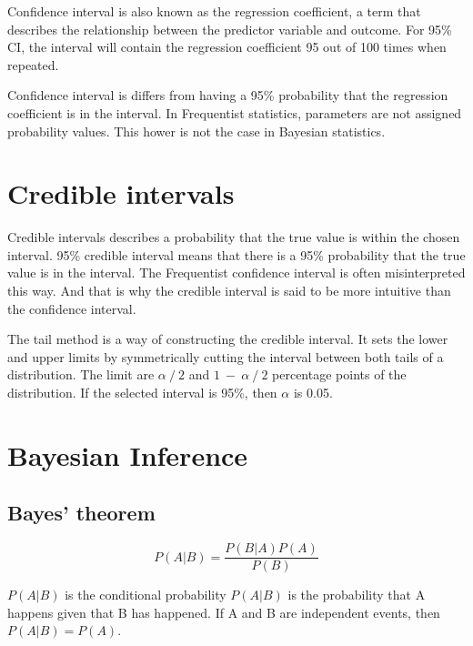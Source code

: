 Confidence interval is also known as the regression coefficient, a term that describes the relationship between the predictor variable and outcome.\cite{RegressionCoefficients} For 95\% CI, the interval will contain the regression coefficient 95 out of 100 times when repeated.\cite{Schoot2014BayesianA} 

Confidence interval is differs from having a 95\% probability that the regression coefficient is in the interval. In Frequentist statistics, parameters are not assigned probability values. \cite{FornaconWood2022UnderstandingTD} This hower is not the case in Bayesian statistics.

\section{Credible intervals}\label{CredibilityIntervals}

Credible intervals describes a probability that the true value is within the chosen interval. 95\% credible interval means that there is a 95\% probability that the true value is in the interval. The Frequentist confidence interval is often misinterpreted this way. And that is why the credible interval is said to be more intuitive than the confidence interval.\cite{FornaconWood2022UnderstandingTD} 

The tail method is a way of constructing the credible interval. It sets the lower and upper limits by symmetrically cutting the interval between both tails of a distribution. The limit are $\alpha\ /\ 2$ and $1\ -\ \alpha\ /\ 2$ percentage points of the distribution. If the selected interval is 95\%, then $\alpha$ is 0.05. \cite{Shi2009BayesianCI}

\section{Bayesian Inference}\label{BayesianInference}

\subsection{Bayes' theorem}\label{BayesianTheorem}
\begin{equation}
P(A|B) = \frac{P(B|A)P(A)}{P(B)}
\end{equation}

$P(A|B)$ is the conditional probability \cite{Gut2005ProbabilityAG} $P(A|B)$ is the probability that A happens given that B has happened. If A and B are independent events, then $P(A|B) = P(A)$. \cite{Gut2005ProbabilityAG}

